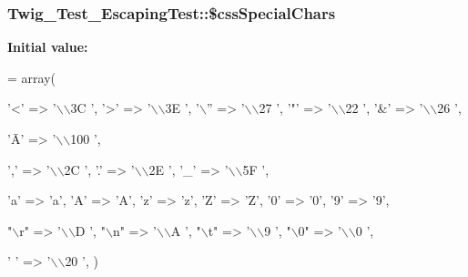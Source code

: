 \subsubsection[{\texorpdfstring{\$css\+Special\+Chars}{$cssSpecialChars}}]{\setlength{\rightskip}{0pt plus 5cm}Twig\+\_\+\+Test\+\_\+\+Escaping\+Test\+::\$css\+Special\+Chars\hspace{0.3cm}{\ttfamily [protected]}}\hypertarget{classTwig__Test__EscapingTest_ab3aa985d7880177be489034626c88698}{}\label{classTwig__Test__EscapingTest_ab3aa985d7880177be489034626c88698}
{\bfseries Initial value\+:}
\begin{DoxyCode}
= array(
        
        \textcolor{charliteral}{'<'} => \textcolor{stringliteral}{'\(\backslash\)\(\backslash\)3C '},
        \textcolor{charliteral}{'>'} => \textcolor{stringliteral}{'\(\backslash\)\(\backslash\)3E '},
        \textcolor{charliteral}{'\(\backslash\)''} => \textcolor{stringliteral}{'\(\backslash\)\(\backslash\)27 '},
        \textcolor{charliteral}{'"'} => \textcolor{stringliteral}{'\(\backslash\)\(\backslash\)22 '},
        \textcolor{charliteral}{'&'} => \textcolor{stringliteral}{'\(\backslash\)\(\backslash\)26 '},
        
        \textcolor{stringliteral}{'Ā'} => \textcolor{stringliteral}{'\(\backslash\)\(\backslash\)100 '},
        
        \textcolor{charliteral}{','} => \textcolor{stringliteral}{'\(\backslash\)\(\backslash\)2C '},
        \textcolor{charliteral}{'.'} => \textcolor{stringliteral}{'\(\backslash\)\(\backslash\)2E '},
        \textcolor{charliteral}{'\_'} => \textcolor{stringliteral}{'\(\backslash\)\(\backslash\)5F '},
        
        \textcolor{charliteral}{'a'} => \textcolor{charliteral}{'a'},
        \textcolor{charliteral}{'A'} => \textcolor{charliteral}{'A'},
        \textcolor{charliteral}{'z'} => \textcolor{charliteral}{'z'},
        \textcolor{charliteral}{'Z'} => \textcolor{charliteral}{'Z'},
        \textcolor{charliteral}{'0'} => \textcolor{charliteral}{'0'},
        \textcolor{charliteral}{'9'} => \textcolor{charliteral}{'9'},
        
        \textcolor{stringliteral}{"\(\backslash\)r"} => \textcolor{stringliteral}{'\(\backslash\)\(\backslash\)D '},
        \textcolor{stringliteral}{"\(\backslash\)n"} => \textcolor{stringliteral}{'\(\backslash\)\(\backslash\)A '},
        \textcolor{stringliteral}{"\(\backslash\)t"} => \textcolor{stringliteral}{'\(\backslash\)\(\backslash\)9 '},
        \textcolor{stringliteral}{"\(\backslash\)0"} => \textcolor{stringliteral}{'\(\backslash\)\(\backslash\)0 '},
        
        \textcolor{charliteral}{' '} => \textcolor{stringliteral}{'\(\backslash\)\(\backslash\)20 '},
    )
\end{DoxyCode}

